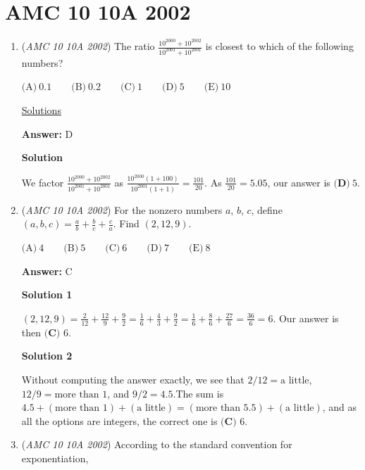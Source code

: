 \section{AMC 10 10A 2002}
        \begin{enumerate}
        	\item (\textit{AMC 10 10A 2002}) The ratio $\frac{10^{2000}+10^{2002}}{10^{2001}+10^{2001}}$ is closest to which of the following numbers?


 $\text{(A)}\ 0.1 \qquad \text{(B)}\ 0.2 \qquad \text{(C)}\ 1 \qquad \text{(D)}\ 5 \qquad \text{(E)}\ 10$


 \href{https://artofproblemsolving.com/wiki/index.php?title=2002\_AMC\_10A\_Problems/Problem\_1}{Solutions}


 
 \textbf{Answer: }D



\textbf{Solution}

We factor $\frac{10^{2000}+10^{2002}}{10^{2001}+10^{2001}}$ as $\frac{10^{2000}(1+100)}{10^{2001}(1+1)}=\frac{101}{20}$. As $\frac{101}{20}=5.05$, our answer is $\boxed{\textbf{(D)}\ 5 }$.

 


	\item (\textit{AMC 10 10A 2002}) For the nonzero numbers $a$, $b$, $c$, define $(a, b, c) = \frac{a}{b} + \frac{b}{c} + \frac{c}{a}$. Find $(2, 12, 9)$.


 $\text{(A)}\ 4 \qquad \text{(B)}\ 5 \qquad \text{(C)}\ 6 \qquad \text{(D)}\ 7 \qquad \text{(E)}\ 8$

 \textbf{Answer: }C



\textbf{Solution 1}

$(2, 12, 9)=\frac{2}{12}+\frac{12}{9}+\frac{9}{2}=\frac{1}{6}+\frac{4}{3}+\frac{9}{2}=\frac{1}{6}+\frac{8}{6}+\frac{27}{6}=\frac{36}{6}=6$. Our answer is then $\boxed{\textbf{(C) }6}$.

 



\textbf{Solution 2}

Without computing the answer exactly, we see that $2/12=\text{a little}$, $12/9=\text{more than }1$, and $9/2=4.5$.The sum is $4.5 + (\text{more than }1) + (\text{a little}) = (\text{more than }5.5) + (\text{a little})$, and as all the options are integers, the correct one is $\boxed{\textbf{(C) }6}$.

 


	\item (\textit{AMC 10 10A 2002}) According to the standard convention for exponentiation, 



\end{enumerate}
